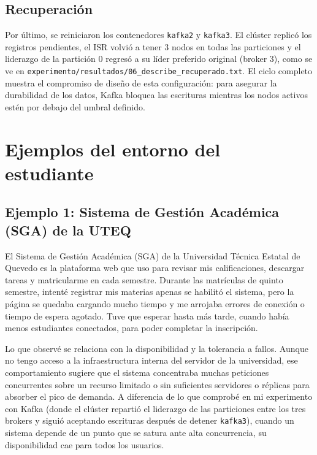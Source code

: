 \documentclass[12pt,a4paper]{article}
\begin{document}
\subsection{Recuperación}
Por último, se reiniciaron los contenedores \texttt{kafka2} y \texttt{kafka3}. El clúster replicó los registros pendientes, el ISR volvió a tener 3 nodos en todas las particiones y el liderazgo de la partición 0 regresó a su líder preferido original (broker 3), como se ve en \texttt{experimento/resultados/06\_describe\_recuperado.txt}. El ciclo completo muestra el compromiso de diseño de esta configuración: para asegurar la durabilidad de los datos, Kafka bloquea las escrituras mientras los nodos activos estén por debajo del umbral definido.

\section{Ejemplos del entorno del estudiante}\label{sec:entorno}

\subsection{Ejemplo 1: Sistema de Gestión Académica (SGA) de la UTEQ}
El Sistema de Gestión Académica (SGA) de la Universidad Técnica Estatal de Quevedo es la plataforma web que uso para revisar mis calificaciones, descargar tareas y matricularme en cada semestre. Durante las matrículas de quinto semestre, intenté registrar mis materias apenas se habilitó el sistema, pero la página se quedaba cargando mucho tiempo y me arrojaba errores de conexión o tiempo de espera agotado. Tuve que esperar hasta más tarde, cuando había menos estudiantes conectados, para poder completar la inscripción.

Lo que observé se relaciona con la disponibilidad y la tolerancia a fallos. Aunque no tengo acceso a la infraestructura interna del servidor de la universidad, ese comportamiento sugiere que el sistema concentraba muchas peticiones concurrentes sobre un recurso limitado o sin suficientes servidores o réplicas para absorber el pico de demanda. A diferencia de lo que comprobé en mi experimento con Kafka (donde el clúster repartió el liderazgo de las particiones entre los tres brokers y siguió aceptando escrituras después de detener \texttt{kafka3}), cuando un sistema depende de un punto que se satura ante alta concurrencia, su disponibilidad cae para todos los usuarios.
\end{document}
